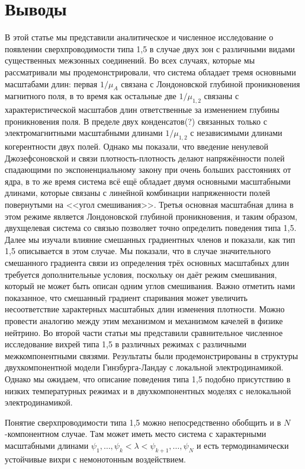 \chapter{Выводы}
\label{ch:5}

В этой статье мы представили аналитическое и численное исследование о 
появлении сверхпроводимости типа 1,5 в случае двух зон с различными видами 
существенных межзонных соединений. Во всех случаях, которые мы рассматривали 
мы продемонстрировали, что система обладает тремя основными масштабами длин: 
первая \( 1/\mu_A \) связана с Лондоновской глубиной 
проникновения магнитного поля, в то время как остальные две \( 1/\mu_{1,2} \) 
связаны с характеристической масштабов длин ответственные за изменением 
глубины проникновения поля. В пределе двух конденсатов(?) связанных только с 
электромагнитными масштабными длинами \( 1/\mu_{1,2} \) с независимыми  
длинами когерентности двух полей. Однако мы показали, что введение ненулевой 
Джозефсоновской и связи плотность-плотность делают напряжённости полей 
спадающими по экспоненциальному закону при очень больших расстояниях от ядра, 
в то же время система всё ещё обладает двумя основными масштабными длинами, 
которые связаны с линейной комбинации напряженности полей повернутыми на 
<<угол смешивания>>. Третья основная масштабная длина в этом режиме является 
Лондоновской глубиной проникновения, и таким образом, двухщелевая система со 
связью позволяет точно определить поведения типа 1,5. Далее мы изучали влияние 
смешанных градиентных членов и показали, как тип 1,5 описывается в этом 
случае. Мы показали, что в случае значительного смешанного градиента связи из 
определения трёх основных масштабных длин требуется дополнительные условия, 
поскольку он даёт режим смешивания, который не может быть описан одним углов 
смешивания. Важно отметить нами показанное, что смешанный градиент спаривания 
может увеличить несоответствие характерных масштабных длин изменения 
плотности. Можно провести аналогию между этим механизмом и механизмом качелей 
в физике нейтрино. Во второй части статьи мы представили сравнительное 
численное исследование вихрей типа 1,5 в различных режимах с различными 
межкомпонентными связями. Результаты были продемонстрированы в структуры 
двухкомпонентной модели Гинзбурга-Ландау с локальной электродинамикой. Однако 
мы ожидаем, что описание поведения типа 1,5 подобно присутствию в низких 
температурных режимах и в двухкомпонентных моделях с нелокальной 
электродинамикой.   

Понятие сверхпроводимости типа 1,5 можно непосредственно обобщить и в 
\( N \)-компонентном случае. Там может иметь место система с  
характерными масштабными длинами 
\( 
	\psi_1, \ldots, \psi_k < \lambda < \psi_{k+1}, \ldots, \psi_N
\) 
и есть термодинамически устойчивые вихри с немонотонным воздействием. 

